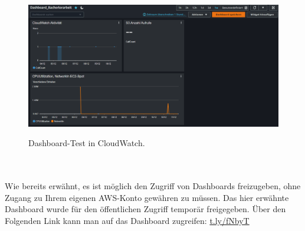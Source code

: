 \begin{figure}[h!]
  \centering
  \includegraphics[scale=0.4]{sources/CloudWatchDashboardTest}
  \caption[Dashboard-Test in CloudWatch]{}
  \label{fig:CloudWatchDashboardTest} 
  Dashboard-Test in CloudWatch.
\end{figure}
\\\\
Wie bereits erwähnt, es ist möglich den Zugriff von Dashboards freizugeben, ohne Zugang zu Ihrem eigenen AWS-Konto gewähren zu müssen. Das hier erwähnte Dashboard wurde für den öffentlichen Zugriff temporär freigegeben. Über den Folgenden Link kann man auf das Dashboard zugreifen: \url{t.ly/fNbyT} %
